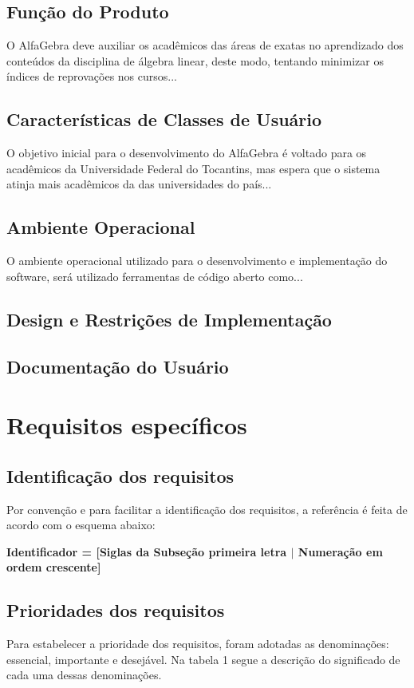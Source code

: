 \documentclass{scrreprt}
\begin{document}
\section{Função do Produto}
O AlfaGebra deve auxiliar os acadêmicos das áreas de exatas no aprendizado dos conteúdos da disciplina de álgebra linear, deste modo, tentando minimizar os índices de reprovações nos cursos...

\section{Características de Classes de Usuário}
O objetivo inicial para o desenvolvimento do AlfaGebra é voltado para os acadêmicos da Universidade Federal do Tocantins, mas espera que o sistema atinja mais acadêmicos da das universidades do país...

\section{Ambiente Operacional}
O ambiente operacional utilizado para o desenvolvimento e implementação do software, será utilizado ferramentas de código aberto como...

\section{Design e Restrições de Implementação}

\section{Documentação do Usuário}


\chapter{Requisitos específicos}

\section{Identificação dos requisitos}

Por convenção e para facilitar a identificação dos requisitos, a referência é feita de acordo com o esquema abaixo:
\begin{center}
    \textbf{Identificador = [Siglas da Subseção primeira letra $\mid$  Numeração em ordem crescente]}
\end{center}

\section{Prioridades dos requisitos}
Para estabelecer a prioridade dos requisitos, foram adotadas as denominações: essencial, importante e desejável. Na tabela 1 segue a descrição do significado de cada uma dessas denominações.
\end{document}
